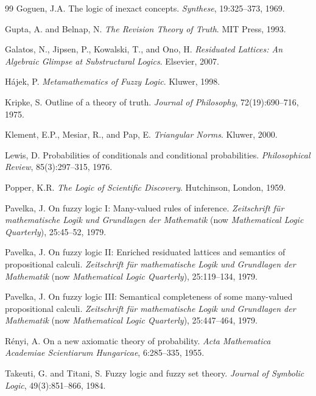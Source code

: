 \documentclass[11pt,a4paper]{article}
\begin{document}
\begin{thebibliography}{99}
Goguen, J.A.
\newblock The logic of inexact concepts.
\newblock \emph{Synthese}, 19:325--373, 1969.

Gupta, A. and Belnap, N.
\newblock \emph{The Revision Theory of Truth}.
\newblock MIT Press, 1993.

Galatos, N., Jipsen, P., Kowalski, T., and Ono, H.
\newblock \emph{Residuated Lattices: An Algebraic Glimpse at Substructural Logics}.
\newblock Elsevier, 2007.

H\'ajek, P.
\newblock \emph{Metamathematics of Fuzzy Logic}.
\newblock Kluwer, 1998.

Kripke, S.
\newblock Outline of a theory of truth.
\newblock \emph{Journal of Philosophy}, 72(19):690--716, 1975.

Klement, E.P., Mesiar, R., and Pap, E.
\newblock \emph{Triangular Norms}.
\newblock Kluwer, 2000.

Lewis, D.
\newblock Probabilities of conditionals and conditional probabilities.
\newblock \emph{Philosophical Review}, 85(3):297--315, 1976.

Popper, K.R.
\newblock \emph{The Logic of Scientific Discovery}.
\newblock Hutchinson, London, 1959.

Pavelka, J.
\newblock On fuzzy logic {I}: Many-valued rules of inference.
\newblock \emph{Zeitschrift f\"ur mathematische Logik und Grundlagen der Mathematik} (now \emph{Mathematical Logic Quarterly}), 25:45--52, 1979.

Pavelka, J.
\newblock On fuzzy logic {II}: Enriched residuated lattices and semantics of propositional calculi.
\newblock \emph{Zeitschrift f\"ur mathematische Logik und Grundlagen der Mathematik} (now \emph{Mathematical Logic Quarterly}), 25:119--134, 1979.

Pavelka, J.
\newblock On fuzzy logic {III}: Semantical completeness of some many-valued propositional calculi.
\newblock \emph{Zeitschrift f\"ur mathematische Logik und Grundlagen der Mathematik} (now \emph{Mathematical Logic Quarterly}), 25:447--464, 1979.

R\'enyi, A.
\newblock On a new axiomatic theory of probability.
\newblock \emph{Acta Mathematica Academiae Scientiarum Hungaricae}, 6:285--335, 1955.

Takeuti, G. and Titani, S.
\newblock Fuzzy logic and fuzzy set theory.
\newblock \emph{Journal of Symbolic Logic}, 49(3):851--866, 1984.


\end{thebibliography}
\end{document}
